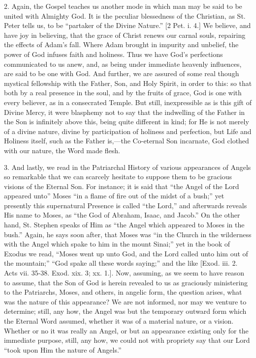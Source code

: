 2. Again, the Gospel teaches us another mode in which man may be
said to be united with Almighty God. It is the peculiar blessedness of
the Christian, as St. Peter tells us, to be ``partaker of the
Divine Nature.'' [2 Pet. i. 4.] We believe, and have joy in
believing, that the grace of Christ renews our carnal souls, repairing
the effects of Adam's fall. Where Adam brought in impurity and
unbelief, the power of God infuses faith and holiness. Thus we have
God's perfections communicated to us anew, and, as being under
immediate heavenly influences, are said to be one with God. And
further, we are assured of some real though mystical fellowship with
the Father, Son, and Holy Spirit, in order to this: so that both by a
real presence in the soul, and by the fruits of grace, God is one with
every believer, as in a consecrated Temple. But still, inexpressible
as is this gift of Divine Mercy, it were blasphemy not to say that the
indwelling of the Father in the Son is infinitely above this, being
quite different in kind; for He is not merely of a divine nature,
divine by participation of holiness and perfection, but Life and
Holiness itself, such as the Father is,—the Co-eternal Son
incarnate, God clothed with our nature, the Word made flesh.

3. And lastly, we read in the Patriarchal History of various
appearances of Angels so remarkable that we can scarcely hesitate to
suppose them to be gracious visions of the Eternal Son. For instance;
it is said that ``the Angel of the Lord appeared unto'' Moses
``in a flame of fire out of the midst of a bush;'' yet
presently this supernatural Presence is called ``the Lord,''
and afterwards reveals His name to Moses, as ``the God of Abraham,
Isaac, and Jacob.'' On the other hand, St. Stephen speaks of Him
as ``the Angel which appeared to Moses in the bush.'' Again,
he says soon after, that Moses was ``in the Church in the
wilderness with the Angel which spake to him in the mount Sinai;''
yet in the book of Exodus we read, ``Moses went up unto God, and
the Lord called unto him out of the mountain;'' ``God spake
all these words saying;'' and the like [Exod. iii. 2. Acts vii.
35-38. Exod. xix. 3; xx. 1.]. Now, assuming, as we seem to have reason
to assume, that the Son of God is herein revealed to us as graciously
ministering to the Patriarchs, Moses, and others, in angelic form, the
question arises, what was the nature of this appearance? We are not
informed, nor may we venture to determine; still, any how, the Angel
was but the temporary outward form which the Eternal Word assumed,
whether it was of a material nature, or a vision. Whether or no it was
really an Angel, or but an appearance existing only for the immediate
purpose, still, any how, we could not with propriety say that our Lord
``took upon Him the nature of Angels.''


